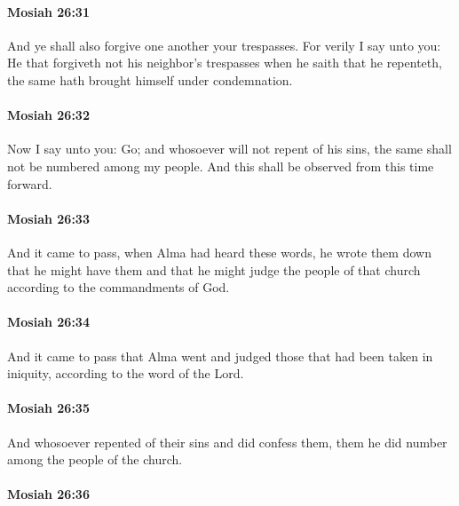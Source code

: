 		\paragraph{Mosiah 26:31} %
			\label{MOSIAH-26-31}

			And ye shall also forgive one another your trespasses.
			For verily I say unto you:
			He that forgiveth not his neighbor's trespasses when he saith that he repenteth,
			the same hath brought himself under condemnation.

		\paragraph{Mosiah 26:32} %
			\label{MOSIAH-26-32}

			Now I say unto you: Go;
			and whosoever will not repent of his sins,
			the same shall not be numbered among my people.
			And this shall be observed from this time forward.

		\paragraph{Mosiah 26:33} %
			\label{MOSIAH-26-33}

			And it came to pass,
			when Alma had heard these words,
			he wrote them down
			that he might have them
			and that he might judge the people of that church
			according to the commandments of God.

		\paragraph{Mosiah 26:34} %
			\label{MOSIAH-26-34}

			And it came to pass that Alma went
			and judged those that had been taken in iniquity,
			according to the word of the Lord.

		\paragraph{Mosiah 26:35} %
			\label{MOSIAH-26-35}

			And whosoever repented of their sins and did confess them,
			them he did number among the people of the church.

		\paragraph{Mosiah 26:36} %
			\label{MOSIAH-26-36}


